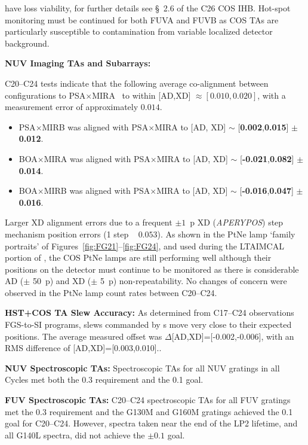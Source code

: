 \begin{description}
{	have loss viability, for further details see \S~2.6 of the C26 COS IHB.
	Hot-spot monitoring must be continued for both FUVA and FUVB as COS TAs are particularly susceptible to contamination from variable localized detector background.
}
\item{\bf NUV Imaging TAs and Subarrays:}{
	C20--C24  tests indicate that the following average co-alignment between  configurations to PSA$\times$MIRA ~to within [AD,XD] $\approx [0.010,0.020]$\arcsec{}, with a measurement error of approximately $0.014$\arcsec{}.
	\begin{itemize}
	\item PSA$\times$MIRB was aligned with PSA$\times$MIRA to [AD, XD] $\sim$ [{\bf 0.002},{\bf 0.015}] $\pm$ {\bf 0.012}\arcsec.
	\item BOA$\times$MIRA was aligned with PSA$\times$MIRA to [AD, XD] $\sim$ [{\bf-0.021},{\bf 0.082}] $\pm$ {\bf 0.014}\arcsec.
	\item BOA$\times$MIRB was aligned with PSA$\times$MIRA to [AD, XD] $\sim$ [{\bf-0.016},{\bf 0.047}] $\pm$ {\bf 0.016}\arcsec.
	\end{itemize}
	Larger XD alignment errors due to a frequent $\pm 1$~p XD (\textit{APERYPOS}) step mechanism position errors (1 step ~ $0.053$\arcsec{}).
	As shown in the PtNe lamp `family portraits' of Figures~\ref{fig:FG21}--\ref{fig:FG24}, and used during the \textsc{LTAIMCAL} portion of ,
	the COS PtNe lamps are still performing well although their positions on the detector must continue to be monitored as there is
	considerable AD ($\pm$ 50~p) and XD ($\pm$ 5~p) non-repeatability.
	No changes of concern were observed in the PtNe lamp count rates between C20--C24.
}
\item{\bf HST+COS TA Slew Accuracy:}{
	As determined from C17--C24 observations FGS-to-SI programs, slews commanded by s move very close to their expected positions.
	The average measured offset was $\Delta$[AD,XD]=[-0.002,-0.006]\arcsec{}, with an RMS difference of [AD,XD]=[0.003,0.010]\arcsec{}..
}
\item{\bf NUV Spectroscopic TAs:}{
	Spectroscopic TAs for all NUV gratings in all Cycles met both the 0.3\arcsec{} requirement and the 0.1\arcsec{} goal.
}
\item{\bf FUV Spectroscopic TAs:}{
	C20--C24 spectroscopic TAs for all FUV gratings met the $0.3$\arcsec{} requirement and the G130M and G160M gratings achieved the 0.1\arcsec{} goal for C20--C24.
	However, spectra taken near the end of the LP2 lifetime, and all G140L spectra, did not achieve the $\pm 0.1$\arcsec{} goal.
}
\end{description}

